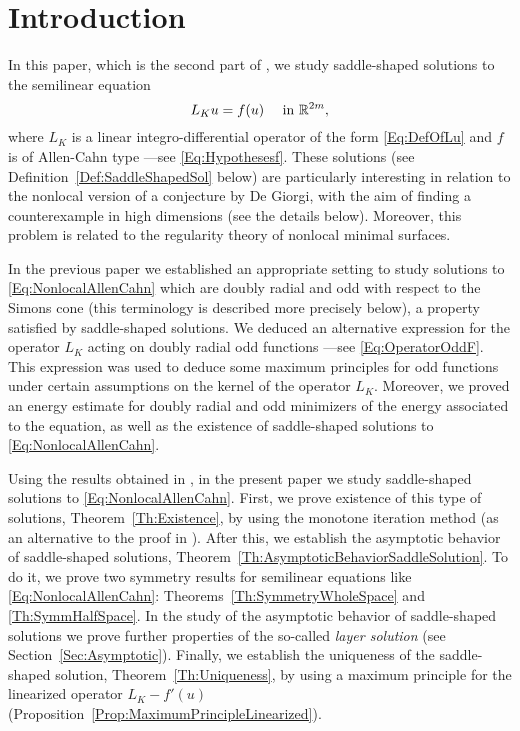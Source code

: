 \section{Introduction}
\label{Sec:Introduction}
 
In this paper, which is the second part of \cite{FelipeSanz-Perela:IntegroDifferentialI}, we study saddle-shaped solutions to the semilinear equation
\begin{equation}
\label{Eq:NonlocalAllenCahn}
L_K u = f(u) \quad \textrm{ in } \mathbb{R}^{2m},
\end{equation}
where $L_K$ is a linear integro-differential operator of the form \eqref{Eq:DefOfLu} and $f$ is of Allen-Cahn type ---see \eqref{Eq:Hypothesesf}. These  solutions (see Definition~\ref{Def:SaddleShapedSol} below) are particularly interesting in relation to the nonlocal version of a conjecture by De Giorgi, with the aim of finding a counterexample in high dimensions (see the details below). Moreover, this problem is related to the regularity theory of nonlocal minimal surfaces.

In the previous paper \cite{FelipeSanz-Perela:IntegroDifferentialI} we established an appropriate setting to study solutions to \eqref{Eq:NonlocalAllenCahn} which are doubly radial and odd with respect to the Simons cone (this terminology is described more precisely below), a property satisfied by saddle-shaped solutions. We deduced an alternative expression for the operator $L_K$ acting on doubly radial odd functions ---see \eqref{Eq:OperatorOddF}. This expression was used to deduce some maximum principles for odd functions under certain assumptions on the kernel of the operator $L_K$. Moreover, we proved an energy estimate for doubly radial and odd minimizers of the energy associated to the equation, as well as the existence of saddle-shaped solutions to \eqref{Eq:NonlocalAllenCahn}.

Using the results obtained in \cite{FelipeSanz-Perela:IntegroDifferentialI}, in the present paper we study saddle-shaped solutions to \eqref{Eq:NonlocalAllenCahn}. First, we prove existence of this type of solutions, Theorem~\ref{Th:Existence}, by using the monotone iteration method (as an alternative to the proof in \cite{FelipeSanz-Perela:IntegroDifferentialI}). After this, we establish the asymptotic behavior of saddle-shaped solutions,  Theorem~\ref{Th:AsymptoticBehaviorSaddleSolution}. To do it, we prove two symmetry results for semilinear equations like \eqref{Eq:NonlocalAllenCahn}: Theorems~\ref{Th:SymmetryWholeSpace} and \ref{Th:SymmHalfSpace}. In the study of the asymptotic behavior of saddle-shaped solutions we prove further properties of the so-called \emph{layer solution} (see Section~\ref{Sec:Asymptotic}). Finally, we establish the uniqueness of the saddle-shaped solution, Theorem~\ref{Th:Uniqueness}, by using a maximum principle for the linearized operator $L_K - f'(u)$ (Proposition~\ref{Prop:MaximumPrincipleLinearized}).

